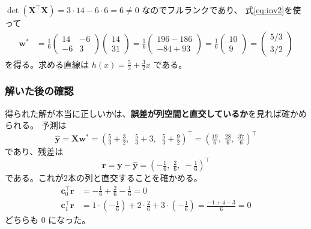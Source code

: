 $\det(\bm{X}^\top\bm{X}) = 3 \cdot 14 - 6 \cdot 6 = 6 \neq 0$ なのでフルランクであり、
式\eqref{eq:inv2}を使って
\begin{align*}
  \bm{w}^*
    &= \frac{1}{6}\begin{pmatrix} 14 & -6 \\ -6 & 3 \end{pmatrix}
       \begin{pmatrix} 14 \\ 31 \end{pmatrix}
     = \frac{1}{6}\begin{pmatrix} 196 - 186 \\ -84 + 93 \end{pmatrix}
     = \frac{1}{6}\begin{pmatrix} 10 \\ 9 \end{pmatrix}
     = \begin{pmatrix} 5/3 \\ 3/2 \end{pmatrix}
\end{align*}
を得る。求める直線は $h(x) = \frac{5}{3} + \frac{3}{2}x$ である。

\subsubsection{解いた後の確認}

得られた解が本当に正しいかは、\textbf{誤差が列空間と直交しているか}を見れば確かめられる。
予測は
\begin{equation*}
  \hat{\bm{y}} = \bm{X}\bm{w}^*
   = \left( \tfrac{5}{3} + \tfrac{3}{2},\;\; \tfrac{5}{3} + 3,\;\; \tfrac{5}{3} + \tfrac{9}{2} \right)^\top
   = \left( \tfrac{19}{6},\; \tfrac{28}{6},\; \tfrac{37}{6} \right)^\top
\end{equation*}
であり、残差は
\begin{equation*}
  \bm{r} = \bm{y} - \hat{\bm{y}}
   = \left( -\tfrac{1}{6},\; \tfrac{2}{6},\; -\tfrac{1}{6} \right)^\top
\end{equation*}
である。これが2本の列と直交することを確かめる。
\begin{align*}
  \bm{c}_0^\top\bm{r} &= -\tfrac{1}{6} + \tfrac{2}{6} - \tfrac{1}{6} = 0 \\
  \bm{c}_1^\top\bm{r} &= 1 \cdot \left(-\tfrac{1}{6}\right) + 2 \cdot \tfrac{2}{6} + 3 \cdot \left(-\tfrac{1}{6}\right)
                       = \tfrac{-1 + 4 - 3}{6} = 0
\end{align*}
どちらも $0$ になった。

